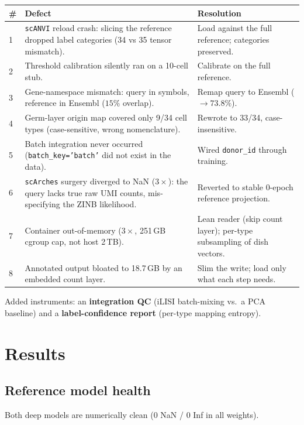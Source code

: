 \documentclass[11pt]{article}
\begin{document}
\begin{table}[H]
\centering
\small
\begin{tabular}{@{}p{0.4cm} p{7.4cm} p{6.4cm}@{}}
\toprule
\# & \textbf{Defect} & \textbf{Resolution} \\
\midrule
1 & \texttt{scANVI} reload crash: slicing the reference dropped label categories (34 vs 35 tensor mismatch). & Load against the full reference; categories preserved. \\
2 & Threshold calibration silently ran on a 10-cell stub. & Calibrate on the full reference. \\
3 & Gene-namespace mismatch: query in symbols, reference in Ensembl ($15\%$ overlap). & Remap query to Ensembl ($\to 73.8\%$). \\
4 & Germ-layer origin map covered only 9/34 cell types (case-sensitive, wrong nomenclature). & Rewrote to 33/34, case-insensitive. \\
5 & Batch integration never occurred (\texttt{batch\_key='batch'} did not exist in the data). & Wired \texttt{donor\_id} through training. \\
6 & \texttt{scArches} surgery diverged to NaN ($3\times$): the query lacks true raw UMI counts, mis-specifying the ZINB likelihood. & Reverted to stable 0-epoch reference projection. \\
7 & Container out-of-memory ($3\times$, 251\,GB cgroup cap, not host 2\,TB). & Lean reader (skip count layer); per-type subsampling of dish vectors. \\
8 & Annotated output bloated to 18.7\,GB by an embedded count layer. & Slim the write; load only what each step needs. \\
\bottomrule
\end{tabular}
\end{table}

\noindent Added instruments: an \textbf{integration QC} (iLISI batch-mixing vs.\ a PCA baseline) and a \textbf{label-confidence report} (per-type mapping entropy).

\section{Results}

\subsection{Reference model health}
Both deep models are numerically clean (0 NaN / 0 Inf in all weights).
\end{document}
